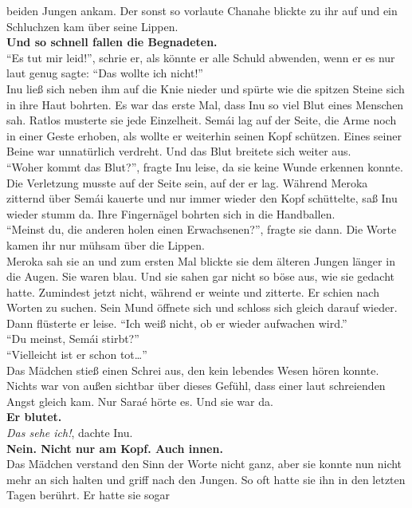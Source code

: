 \documentclass[a4paper,12pt]{book}
\begin{document}
beiden Jungen ankam. Der sonst so vorlaute Chanahe blickte zu ihr auf und ein Schluchzen kam über 
seine Lippen.\\
\textbf{Und so schnell fallen die Begnadeten.}\\
``Es tut mir leid!'', schrie er, als könnte er alle Schuld abwenden, wenn er es nur laut genug 
sagte: ``Das wollte ich nicht!''\\
Inu ließ sich neben ihm auf die Knie nieder und spürte wie die spitzen Steine sich in ihre Haut 
bohrten. Es war das erste Mal, dass Inu so viel Blut eines Menschen sah. Ratlos musterte sie jede 
Einzelheit. Semái lag auf der Seite, die Arme noch in einer Geste erhoben, als wollte er weiterhin 
seinen Kopf schützen. Eines seiner Beine war unnatürlich verdreht. Und das Blut breitete sich 
weiter aus.\\
``Woher kommt das Blut?'', fragte Inu leise, da sie keine Wunde erkennen konnte. Die Verletzung 
musste auf der Seite sein, auf der er lag. Während Meroka zitternd über Semái kauerte und nur immer 
wieder den Kopf schüttelte, saß Inu wieder stumm da. Ihre Fingernägel bohrten sich in die 
Handballen. \\
``Meinst du, die anderen holen einen Erwachsenen?'', fragte sie dann. Die Worte kamen ihr nur 
mühsam über die Lippen.\\
Meroka sah sie an und zum ersten Mal blickte sie dem älteren Jungen länger in die Augen. Sie waren 
blau. Und sie sahen gar nicht so böse aus, wie sie gedacht hatte. Zumindest jetzt nicht, während er 
weinte und zitterte. Er schien nach Worten zu suchen. Sein Mund öffnete sich und schloss sich 
gleich darauf wieder. Dann flüsterte er leise. ``Ich weiß nicht, ob er wieder aufwachen wird.''\\
``Du meinst, Semái stirbt?''\\
``Vielleicht ist er schon tot…''\\
Das Mädchen stieß einen Schrei aus, den kein lebendes Wesen hören konnte. Nichts war von außen 
sichtbar über dieses Gefühl, dass einer laut schreienden Angst gleich kam. Nur Saraé hörte es. Und 
sie war da. \\
\textbf{Er blutet.}\\
\textit{Das sehe ich!}, dachte Inu.\\
\textbf{Nein. Nicht nur am Kopf. Auch innen.}\\
Das Mädchen verstand den Sinn der Worte nicht ganz, aber sie konnte nun nicht mehr an sich halten 
und griff nach den Jungen. So oft hatte sie ihn in den letzten Tagen berührt. Er hatte sie sogar 
\end{document}
